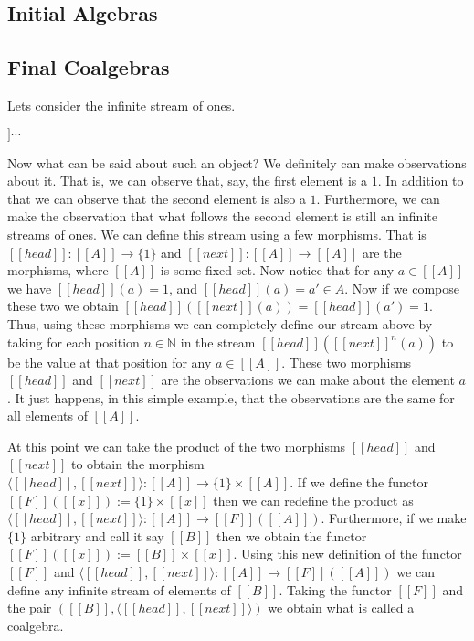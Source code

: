 \subsection{Initial Algebras}
\label{subsec:initial_algebras}


\subsection{Final Coalgebras}
\label{subsec:final_coalgebras}
Lets consider the infinite stream of ones. 
\begin{center}
  \begin{math}
    [[1 :: 1 :: 1 :: 1]] \cdots
  \end{math}
\end{center}
Now what can be said about such an object?  We definitely can make observations about it.
That is, we can observe that, say, the first element is a $1$.  In addition to that we can 
observe that the second element is also a $1$.  Furthermore, we can make the observation 
that what follows the second element is still an infinite streams of ones.
We can define this stream using a few morphisms.  That is $[[head]] : [[A]] \to \{1\}$ and
$[[next]] : [[A]] \to [[A]]$ are the morphisms, where $[[A]]$ is some fixed set.
Now notice that for any $a \in [[A]]$ we have $[[head]](a) = 1$, and 
$[[head]](a) = a' \in A$.  Now if we compose these two we obtain 
$[[head]]([[next]](a)) = [[head]](a') = 1$.  Thus, using these morphisms we can completely
define our stream above by taking for each position $n \in \mathbb{N}$ in the stream 
$[[head]]([[next]]^{n}(a))$ to be the value at that position for any $a \in [[A]]$.  These
two morphisms $[[head]]$ and $[[next]]$ are the observations we can make about the element 
$a$. It just happens, in this simple example, that the observations are the same for all 
elements of $[[A]]$.

At this point we can take the product of the two morphisms $[[head]]$ and $[[next]]$ to
obtain the morphism $\langle [[head]],[[next]] \rangle : [[A]] \to \{1\} \times [[A]]$.
If we define the functor $[[F]]([[x]]) := \{1\} \times [[x]]$ then we can redefine the
product as $\langle [[head]],[[next]] \rangle : [[A]] \to [[F]]([[A]])$.  Furthermore,
if we make $\{1\}$ arbitrary and call it say $[[B]]$ then we obtain 
the functor $[[F]]([[x]]) := [[B]] \times [[x]]$.  Using this new definition of the functor
$[[F]]$ and $\langle [[head]],[[next]] \rangle : [[A]] \to [[F]]([[A]])$ we can define any
infinite stream of elements of $[[B]]$.  Taking the functor $[[F]]$ and the pair
$([[B]], \langle [[head]], [[next]] \rangle)$ we obtain what is called a coalgebra.
